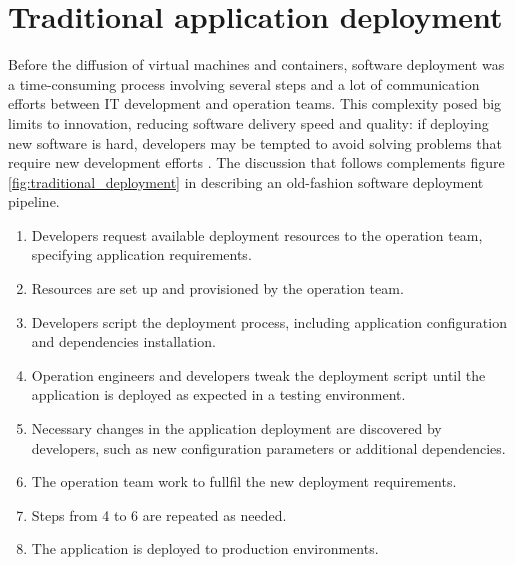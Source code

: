 \section{Traditional application deployment}
Before the diffusion of virtual machines and containers, software deployment was a time-consuming process involving several steps and a lot of communication efforts between IT development and operation teams. 
This complexity posed big limits to innovation, reducing software delivery speed and quality: if deploying new software is hard, developers may be tempted to avoid solving problems that require new development efforts \cite{kaneDockerRunningShipping2023}.
The discussion that follows complements figure \ref{fig:traditional_deployment} in describing an old-fashion software deployment pipeline.
\begin{enumerate}
    \item Developers request available deployment resources to the operation team, specifying application requirements.
    \item Resources are set up and provisioned by the operation team.
    \item Developers script the deployment process, including application configuration and dependencies installation.
    \item Operation engineers and developers tweak the deployment script until the application is deployed as expected in a testing environment.
    \item Necessary changes in the application deployment are discovered by developers, such as new configuration parameters or additional dependencies. 
    \item The operation team work to fullfil the new deployment requirements.
    \item Steps from 4 to 6 are repeated as needed.
    \item The application is deployed to production environments.
\end{enumerate}


